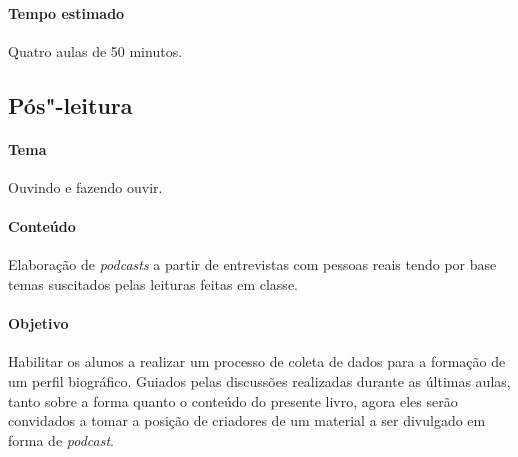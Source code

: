 \documentclass[11pt]{extarticle}
\begin{document}
 \paragraph{Tempo estimado} Quatro aulas de 50 minutos.


\subsection{Pós"-leitura}

 \paragraph{Tema} Ouvindo e fazendo ouvir. 

 \paragraph{Conteúdo} Elaboração de \emph{podcasts} a partir de entrevistas com
 pessoas reais tendo por base temas suscitados pelas leituras feitas em classe.

 \paragraph{Objetivo} Habilitar os alunos a realizar um processo de coleta de dados
 para a formação de um perfil biográfico. Guiados pelas discussões realizadas durante as 
 últimas aulas, tanto sobre a forma quanto o conteúdo do presente livro, agora 
 eles serão convidados a tomar a posição de criadores de um material a ser divulgado
 em forma de \emph{podcast}.
\end{document}
